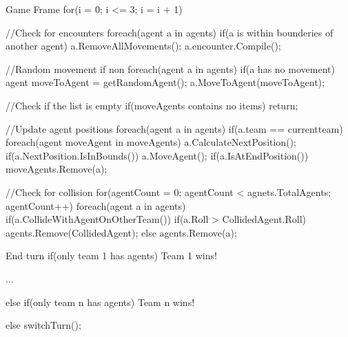 \begin{source}{Game Frame}{}
for(i = 0; i <= 3; i = i + 1)
{
	//Check for encounters
	foreach(agent a in agents)
	{
		if(a is within bounderies of another agent)
		{
			a.RemoveAllMovements();
			a.encounter.Compile();
		}
	}	

	//Random movement if non
	foreach(agent a in agents)
	{
		if(a has no movement)
		{
			agent moveToAgent = getRandomAgent();
			a.MoveToAgent(moveToAgent);
		}
	}

	//Check if the list is empty
	if(moveAgents contains no items)
		return;

	//Update agent positions
	foreach(agent a in agents)
	{
		if(a.team == currentteam)
		{
			foreach(agent moveAgent in moveAgents)
			{
				a.CalculateNextPosition();
				if(a.NextPosition.IsInBounds())
				{
					a.MoveAgent();
				}
				if(a.IsAtEndPosition())
				{
					moveAgents.Remove(a);
				}
			}
		}
	}


	//Check for collision
	for(agentCount = 0; agentCount < agnets.TotalAgents; agentCount++)
	{
		foreach(agent a in agents)
		{
			if(a.CollideWithAgentOnOtherTeam())
			{
				if(a.Roll > CollidedAgent.Roll)
				{
					agents.Remove(CollidedAgent);
				}
				else
				{
					agents.Remove(a);
				}
			}
		}
	}
}

\end{source}

\begin{source}{End turn}{}
if(only team 1 has agents)
{
	Team 1 wins!
}

...

else if(only team n has agents)
{
	Team n wins!
}

else
{
	switchTurn();
}
\end{source}